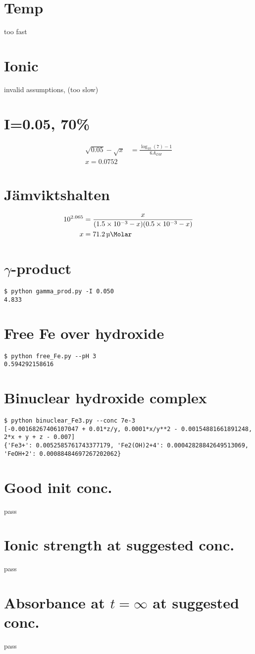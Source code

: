 \documentclass{article}
\begin{document}
\section{Temp}
too fast

\section{Ionic}
invalid assumptions, (too slow)

\section{I=0.05, 70\%}
\begin{align}
\sqrt{0.05} - \sqrt{x} &= \frac{\log_{10}(7) - 1}{6A_{DH}} \\
x = 0.0752
\end{align}

\section{Jämviktshalten }
\begin{align}
10^{2.065} &= \frac{x}{(\num{1.5e-3} - x)(\num{0.5e-3} - x)} \\
x &= \SI{71.2}{\micro\Molar}
\end{align}

\section{$\gamma$-product}
\begin{verbatim}
$ python gamma_prod.py -I 0.050
4.833
\end{verbatim}

\section{Free Fe over hydroxide}
\begin{verbatim}
$ python free_Fe.py --pH 3
0.594292158616
\end{verbatim}

\section{Binuclear hydroxide complex}
\begin{verbatim}
$ python binuclear_Fe3.py --conc 7e-3
[-0.00168267406107047 + 0.01*z/y, 0.0001*x/y**2 - 0.00154881661891248, 2*x + y + z - 0.007]
{'Fe3+': 0.0052585761743377179, 'Fe2(OH)2+4': 0.00042828842649513069, 'FeOH+2': 0.00088484697267202062}
\end{verbatim}

\section{Good init conc.}
pass

\section{Ionic strength at suggested conc.}
pass

\section{Absorbance at $t = \infty$ at suggested conc.}
pass
\end{document}
